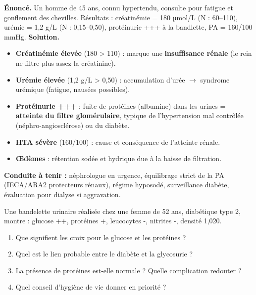 \documentclass[11pt]{article}
\begin{document}
\begin{exoresolu}
\textbf{Énoncé.} Un homme de 45 ans, connu hypertendu, consulte pour fatigue et gonflement des chevilles. Résultats : créatinémie = 180 µmol/L (N : 60--110), urémie = 1,2 g/L (N : 0,15--0,50), protéinurie +++ à la bandlette, PA = 160/100 mmHg.
\tcblower
\textbf{Solution.}
\begin{itemize}
    \item \textbf{Créatinémie élevée} (180 > 110) : marque une \textbf{insuffisance rénale} (le rein ne filtre plus assez la créatinine).
    \item \textbf{Urémie élevée} (1,2 g/L > 0,50) : accumulation d'urée $\rightarrow$ syndrome urémique (fatigue, nausées possibles).
    \item \textbf{Protéinurie +++} : fuite de protéines (albumine) dans les urines = \textbf{atteinte du filtre glomérulaire}, typique de l'hypertension mal contrôlée (néphro-angiosclérose) ou du diabète.
    \item \textbf{HTA sévère} (160/100) : cause et conséquence de l'atteinte rénale.
    \item \textbf{Œdèmes} : rétention sodée et hydrique due à la baisse de filtration.
\end{itemize}
\textbf{Conduite à tenir :} néphrologue en urgence, équilibrage strict de la PA (IECA/ARA2 protecteurs rénaux), régime hyposodé, surveillance diabète, évaluation pour dialyse si aggravation.

\end{exoresolu}

\begin{exercice}
Une bandelette urinaire réalisée chez une femme de 52 ans, diabétique type 2, montre : glucose ++, protéines +, leucocytes -, nitrites -, densité 1,020.
\begin{enumerate}
    \item Que signifient les croix pour le glucose et les protéines ?
    \item Quel est le lien probable entre le diabète et la glycosurie ?
    \item La présence de protéines est-elle normale ? Quelle complication redouter ?
    \item Quel conseil d'hygiène de vie donner en priorité ?
\end{enumerate}
\end{exercice}
\end{document}
